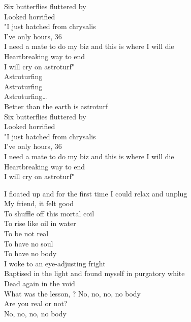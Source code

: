 Six butterflies fluttered by \\
Looked horrified \\
"I just hatched from chrysalis \\
I've only hours, 36 \\
I need a mate to do my biz and this is where I will die \\
Heartbreaking way to end \\
I will cry on astroturf" \\

Astroturfing \\
Astroturfing \\
Astroturfing… \\
Better than the earth is astroturf \\

Six butterflies fluttered by \\
Looked horrified \\
"I just hatched from chrysalis \\
I've only hours, 36 \\
I need a mate to do my biz and this is where I will die \\
Heartbreaking way to end \\
I will cry on astroturf" \\




I floated up and for the first time I could relax and unplug \\
My friend, it felt good \\

To shuffle off this mortal coil \\
To rise like oil in water \\

To be not real \\
To have no soul \\
To have no body \\

I woke to an eye-adjusting fright \\
Baptised in the light and found myself in purgatory white \\
Dead again in the void \\

What was the lesson, ?
No, no, no, no body \\
Are you real or not? \\
No, no, no, no body \\

